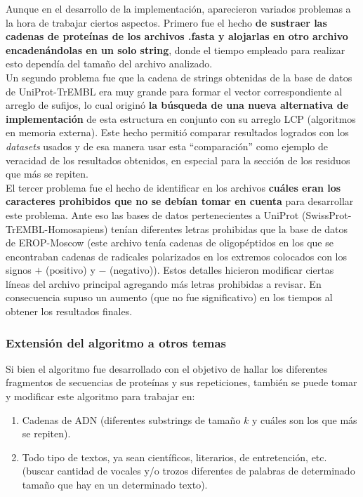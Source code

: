 Aunque en el desarrollo de la implementación, aparecieron variados problemas a la hora de trabajar ciertos aspectos. Primero fue el hecho \textbf{de sustraer las cadenas de proteínas de los archivos .fasta y alojarlas en otro archivo encadenándolas en un solo string}, donde el tiempo empleado para realizar esto dependía del tamaño del archivo analizado.\\
Un segundo problema fue que la cadena de strings obtenidas de la base de datos de UniProt-TrEMBL era muy grande para formar el vector correspondiente al arreglo de sufijos, lo cual originó \textbf{la búsqueda de una nueva alternativa de implementación} de esta estructura en conjunto con su arreglo LCP (algoritmos en memoria externa). Este hecho permitió comparar resultados logrados con los \textit{datasets} usados y de esa manera usar esta ``comparación'' como ejemplo de veracidad de los resultados obtenidos, en especial para la sección de los residuos que más se repiten.\\
El tercer problema fue el hecho de identificar en los archivos \textbf{cuáles eran los caracteres prohibidos que no se debían tomar en cuenta} para desarrollar este problema. Ante eso las bases de datos pertenecientes a UniProt (SwissProt-TrEMBL-Homosapiens) tenían diferentes letras prohibidas que la base de datos de EROP-Moscow (este archivo tenía cadenas de oligopéptidos en los que se encontraban cadenas de radicales polarizados en los extremos colocados con los signos $+$ (positivo) y $-$ (negativo)). Estos detalles hicieron modificar ciertas líneas del archivo principal agregando más letras prohibidas a revisar. En consecuencia supuso un aumento (que no fue significativo) en los tiempos al obtener los resultados finales.

\subsubsection{Extensión del algoritmo a otros temas}

Si bien el algoritmo fue desarrollado con el objetivo de hallar los diferentes fragmentos de secuencias de proteínas y sus repeticiones, también se puede tomar y modificar este algoritmo para trabajar en:

\begin{enumerate}

\item Cadenas de ADN (diferentes substrings de tamaño $k$ y cuáles son los que más se repiten).
\item Todo tipo de textos, ya sean científicos, literarios, de entretención, etc. (buscar cantidad de vocales y/o trozos diferentes de palabras de determinado tamaño que hay en un determinado texto).

\end{enumerate}

